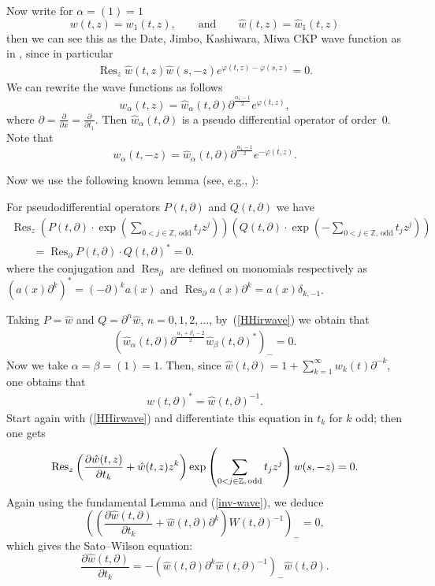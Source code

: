 \documentclass[pdftex]{sigma}
\numberwithin{equation}{section}
\newcommand{\Res}{\mathop\mathrm{Res}\nolimits}
\begin{document}
Now write for $\alpha=(1)=1$
\[
w(t,z)=w_1(t,z),\qquad\mbox{and}\qquad {\hat w}(t,z)={\hat
w}_1(t,z)
\]
then we can see this as the Date, Jimbo, Kashiwara, Miwa CKP wave
function as in \cite{DJKMVI},
 since
in particular
\begin{gather}
\label{HHirwave} \Res_z {\hat w}(t,z){\hat w}(s,-z)
e^{\varphi(t,z)-\varphi(s,z)}=0.
\end{gather}
We can rewrite the wave functions as follows
\[
w_\alpha(t,z)={\hat
w}_\alpha(t,\partial)\partial^{\frac{\alpha_1-1}{2}}e^{\varphi(t,z)},
\]
where $\partial =\frac{\partial}{\partial x}=\frac{\partial}{\partial t_1}$. Then ${\hat
w}_\alpha(t,\partial)$ is a pseudo dif\/ferential operator of order~0. Note that
\[
w_\alpha(t,-z)={\hat w}_\alpha
(t,\partial)\partial^{\frac{\alpha_1-1}{2}}e^{-\varphi(t,z)}.
\]

Now we use the following known lemma (see, e.g., \cite{KL}):

\begin{lemma} For pseudodifferential operators $P(t,\partial)$
and
 $Q(t,\partial)$ we have
\begin{gather*}
\Res_z \left( P(t,\partial)\cdot
\exp\left(\sum_{0<j\in\mathbb{Z},\,\mathrm{odd}}t_jz^j\right)\right)
\left( Q(t,\partial)\cdot \exp\left(-\sum_{0<j\in\mathbb{Z},
\,\mathrm{odd}}t_jz^j\right)\right)
\\
\qquad {}=\Res_\partial P(t,\partial)\cdot
 Q(t,\partial)^*=0.
\end{gather*}
where the conjugation and $\Res_\partial$ are defined on
monomials respectively as
$\left(a(x)\partial^k\right)^*=(-\partial)^k a(x)$ and
$\Res_\partial a(x)\partial^k=a(x)\delta_{k,-1}$.
 \end{lemma}

Taking $P={\hat w}$ and $Q=\partial^n{\hat w}$, $n=0,1,2,\dots$,
by~(\ref{HHirwave}) we obtain that
 \begin{gather}\label{alpha-beta}
\left({\hat
w}_\alpha(t,\partial)\partial^{\frac{\alpha_1+\beta_1-2}{2}}{\hat
w}_\beta(t,\partial)^*\right)_-=0 .
 \end{gather}
Now we take $\alpha=\beta=(1)=1$. Then, since ${\hat
w}(t,\partial)= 1+\sum\limits_{k=1}^\infty w_k(t)\partial^{-k}$, one
obtains that
\begin{gather}
\label{inv-wave} {\hat w}(t,\partial)^*={\hat w}(t,\partial)^{-1} .
\end{gather}
Start again with (\ref{HHirwave}) and dif\/ferentiate this equation
in $t_k$ for $k$ odd; then one gets
\[
\Res_z \left(\frac{\partial {\hat w}(t,z)}{\partial
t_k}+{\hat w}(t,z)z^k\right) \exp\left(\sum_{0<j\in\mathbb{Z},\,
{\rm odd}}t_jz^j\right)w(s,-z)=0 .
\]
Again using the fundamental Lemma and (\ref{inv-wave}), we deduce
\[
\left(\left(\frac{\partial {\hat w}(t,\partial)}{\partial t_k}
+{\hat
w}(t,\partial)\partial^k\right)W(t,\partial)^{-1}\right)_-=0 ,
\]
which gives the Sato--Wilson equation:
\[
\frac{\partial {\hat w}(t,\partial)}{\partial t_k} =-\left({\hat
w}(t,\partial)\partial^k{\hat w}(t,\partial)^{-1}\right)_- {\hat
w}(t,\partial) .
\]
\end{document}
